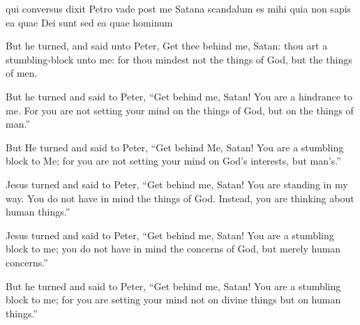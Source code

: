 			\begin{framed}
			\scriptsize
				\begin{compactdesc}
					\item[SBLG] 
					\item[BSV] qui conversus dixit Petro vade post me Satana scandalum es mihi quia non sapis ea quae Dei sunt sed ea quae hominum
					\item[ASV] But he turned, and said unto Peter, Get thee behind me, Satan: thou art a stumbling-block unto me: for thou mindest not the things of God, but the things of men.
					\item[ESV] But he turned and said to Peter, ``Get behind me, Satan! You are a hindrance to me. For you are not setting your mind on the things of God, but on the things of man.''
					\item[NASB] But He turned and said to Peter, ``Get behind Me, Satan! You are a stumbling block to Me; for you are not setting your mind on God's interests, but man's.''
					\item[NIRV] Jesus turned and said to Peter, ``Get behind me, Satan! You are standing in my way. You do not have in mind the things of God. Instead, you are thinking about human things.''
					\item[NIV] Jesus turned and said to Peter, ``Get behind me, Satan! You are a stumbling block to me; you do not have in mind the concerns of God, but merely human concerns.''
					\item[NRSV] But he turned and said to Peter, ``Get behind me, Satan! You are a stumbling block to me; for you are setting your mind not on divine things but on human things.''
				\end{compactdesc}
			\end{framed}

